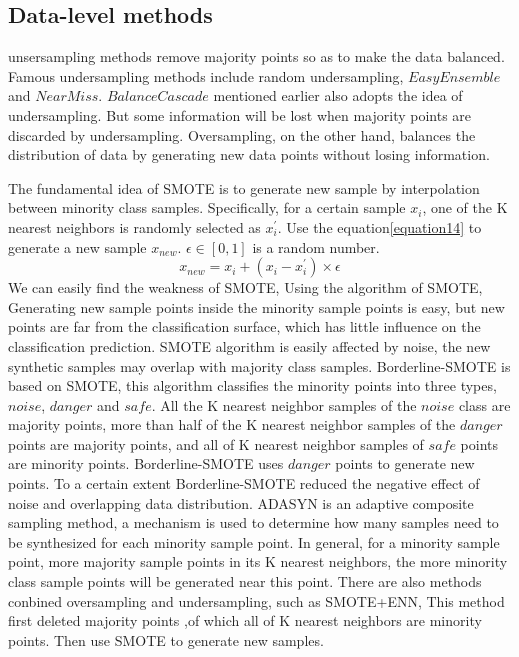 \documentclass[runningheads]{llncs}
\begin{document}
\subsection{Data-level methods}
unsersampling methods \cite{2004Editorial,2004Minority} remove majority points 
so as to make the data balanced. Famous undersampling methods include random undersampling\cite{2018Imbalanced}, 
$EasyEnsemble$\cite{2020EASY} and $NearMiss$\cite{2011Data}.
$BalanceCascade$\cite{2019Class} mentioned earlier also adopts the idea of undersampling.
But some information will be lost when majority points are discarded by undersampling.
Oversampling, on the other hand, balances the distribution of data by generating new data points without losing information.

The fundamental idea of SMOTE is to generate new sample by interpolation between minority class samples\cite{2018SMOTE}.
Specifically, for a certain sample $x_i$, one of the K nearest neighbors is randomly selected as $x_i ^{'}$.
Use the equation\ref{equation14} to generate a new sample $x_{new}$. $\epsilon \in [0,1]$ is a random number.
\begin{equation}
  \label{equation14}
  x_{new}=x_i+(x_i-x_i^{'})\times \epsilon
\end{equation}
We can easily find the weakness of SMOTE,
Using the algorithm of SMOTE, Generating new sample points inside the minority sample points is easy, 
but new points are far from the classification surface, which has little influence on the classification prediction.
SMOTE algorithm is easily affected by noise, 
the new synthetic samples may overlap with majority class samples.
Borderline-SMOTE\cite{2005Borderline} is based on SMOTE, this algorithm classifies
the minority points into three types, 
$noise$, $danger$ and $safe$.
All the K nearest neighbor samples of the $noise$ class are majority points, 
more than half of the K nearest neighbor samples
of the $danger$ points are majority points, and all of K nearest neighbor samples of $safe$ points are minority points.
Borderline-SMOTE uses $danger$ points to generate new points.
To a certain extent Borderline-SMOTE reduced the negative effect of noise and overlapping data distribution.
ADASYN\cite{2008ADASYN} is an adaptive composite sampling method, 
a mechanism is used to determine how many samples need to be synthesized for each minority sample point.
In general, for a minority sample point, more majority sample points in its K nearest neighbors, 
the more minority class sample points will be generated near this point.
There are also methods conbined oversampling and undersampling, such as SMOTE+ENN\cite{2019Electrocardiogram},
This method first deleted majority points ,of which all of K nearest neighbors are minority points.
Then use SMOTE to generate new samples.
\end{document}
